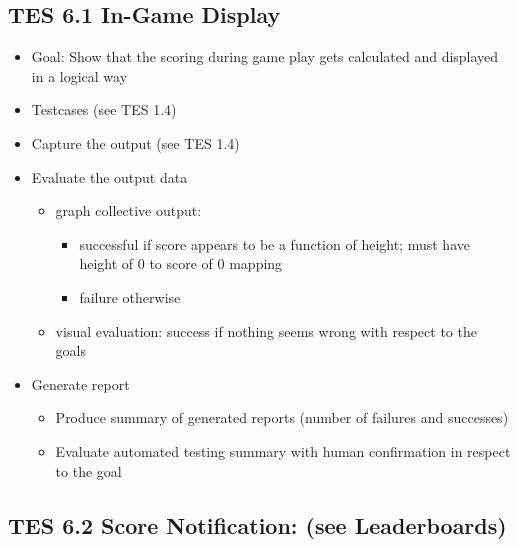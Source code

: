\subsection{TES 6.1 In-Game Display}
\begin{itemize}
\item Goal: Show that the scoring during game play gets calculated and displayed in a logical way

\item Testcases (see TES 1.4)
\item Capture the output (see TES 1.4)
\item Evaluate the output data
\begin{itemize}
\item graph collective output:
\begin{itemize}
\item successful if score appears to be a function of height; must have height of 0 to score of 0 mapping
\item failure otherwise
\end{itemize}
\item visual evaluation: success if nothing seems wrong with respect to the goals
\end{itemize}

\item Generate report
\begin{itemize}
\item Produce summary of generated reports (number of failures and successes)
\item Evaluate automated testing summary with human confirmation in respect to the goal
\end{itemize}
\end{itemize}

\subsection{TES 6.2 Score Notification: (see Leaderboards)}
